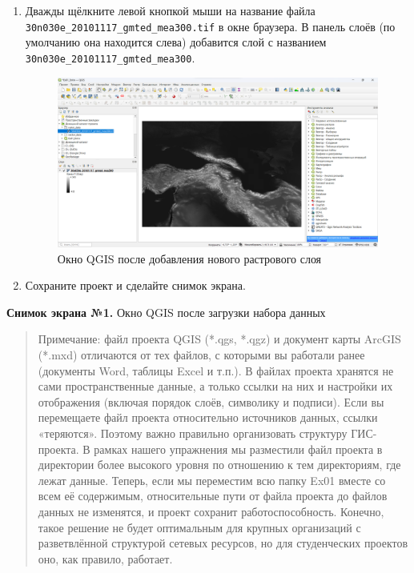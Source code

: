 \documentclass[
  12pt,
]{book}
\begin{document}
\begin{enumerate}
\def\labelenumi{\arabic{enumi}.}
\setcounter{enumi}{6}
\item
  Дважды щёлкните левой кнопкой мыши на название файла \texttt{30n030e\_20101117\_gmted\_mea300.tif} в окне браузера. В панель слоёв (по умолчанию она находится слева) добавится слой с названием \texttt{30n030e\_20101117\_gmted\_mea300}.

  \begin{figure}
  \centering
  \includegraphics{images/Ex01_MapGeneral/screen1.png}
  \caption{Окно QGIS после добавления нового растрового слоя}
  \end{figure}
\item
  Сохраните проект и сделайте снимок экрана.
\end{enumerate}

\textbf{Снимок экрана №1.} Окно QGIS после загрузки набора данных

\begin{quote}
Примечание: файл проекта QGIS (*.qgs, *.qgz) и документ карты ArcGIS (*.mxd) отличаются от тех файлов, с которыми вы работали ранее (документы Word, таблицы Excel и т.п.). В файлах проекта хранятся не сами пространственные данные, а только ссылки на них и настройки их отображения (включая порядок слоёв, символику и подписи). Если вы перемещаете файл проекта относительно источников данных, ссылки «теряются». Поэтому важно правильно организовать структуру ГИС-проекта. В рамках нашего упражнения мы разместили файл проекта в директории более высокого уровня по отношению к тем директориям, где лежат данные. Теперь, если мы переместим всю папку Ex01 вместе со всем её содержимым, относительные пути от файла проекта до файлов данных не изменятся, и проект сохранит работоспособность. Конечно, такое решение не будет оптимальным для крупных организаций с разветвлённой структурой сетевых ресурсов, но для студенческих проектов оно, как правило, работает.
\end{quote}
\end{document}
